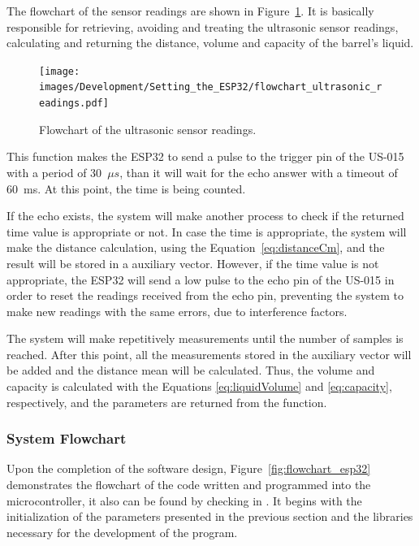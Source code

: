 The flowchart of the sensor readings are shown in Figure~\ref{fig:flowchartUltrasonicReadings}. It is basically responsible for retrieving, avoiding and treating the ultrasonic sensor readings, calculating and returning the distance, volume and capacity of the barrel's liquid.

\begin{figure}[h!]
    \centering
    \texttt{[image: images/Development/Setting\_the\_ESP32/flowchart\_ultrasonic\_readings.pdf]}
    \caption{Flowchart of the ultrasonic sensor readings.}
    \label{fig:flowchartUltrasonicReadings}
\end{figure}

This function makes the ESP32 to send a pulse to the trigger pin of the US-015 with a period of 30~\begin{math}\mu s\end{math}, than it will wait for the echo answer with a timeout of 60~ms. At this point, the time is being counted. 

If the echo exists, the system will make another process to check if the returned time value is appropriate or not. In case the time is appropriate, the system will make the distance calculation, using the Equation~\ref{eq:distanceCm}, and the result will be stored in a auxiliary vector. However, if the time value is not appropriate, the ESP32 will send a low pulse to the echo pin of the US-015 in order to reset the readings received from the echo pin, preventing the system to make new readings with the same errors, due to interference factors.

The system will make repetitively measurements until the number of samples is reached. After this point, all the measurements stored in the auxiliary vector will be added and the distance mean will be calculated. Thus, the volume and capacity is calculated with the Equations \ref{eq:liquidVolume} and \ref{eq:capacity}, respectively, and the parameters are returned from the function.


\subsubsection{System Flowchart}

Upon the completion of the software design, Figure~\ref{fig:flowchart_esp32} demonstrates the flowchart of the code written and programmed into the microcontroller, it also can be found by checking in \cite{COELHO:2019}. It begins with the initialization of the parameters presented in the previous section and the libraries necessary for the development of the program.

